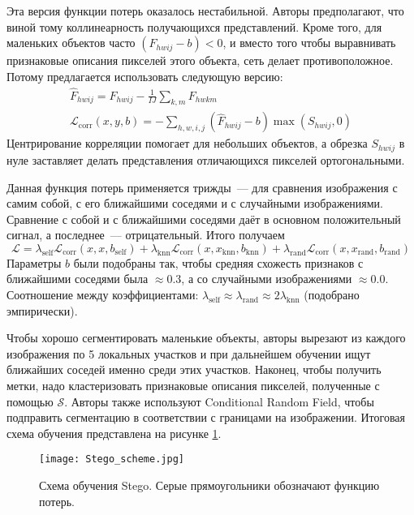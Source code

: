     Эта версия функции потерь оказалось нестабильной.
    Авторы предполагают, что виной тому коллинеарность получающихся представлений.
    Кроме того, для маленьких объектов часто $(F_{hwij} - b) < 0$, и вместо того чтобы выравнивать признаковые описания пикселей этого объекта, сеть делает противоположное.
    Потому предлагается использовать следующую версию:
    \begin{gather}
        \hat{F}_{hwij} = F_{hwij} - \frac{1}{IJ} \sum_{k, m} F_{hwkm} \\
        \mathcal{L}_\text{corr}(x, y, b) = -\sum_{h, w, i, j} (\hat{F}_{hwij} - b) \max(S_{hwij}, 0)
    \end{gather}
    Центрирование корреляции помогает для небольших объектов, а обрезка $S_{hwij}$ в нуле заставляет делать представления отличающихся пикселей ортогональными.

    Данная функция потерь применяется трижды~--- для сравнения изображения с самим собой, с его ближайшими соседями и с случайными изображениями.
    Сравнение с собой и с ближайшими соседями даёт в основном положительный сигнал, а последнее~--- отрицательный.
    Итого получаем 
    \begin{equation}
        \mathcal{L} = \lambda_\text{self} \mathcal{L}_\text{corr}(x, x, b_\text{self}) + 
        \lambda_\text{knn} \mathcal{L}_\text{corr}(x, x_\text{knn}, b_\text{knn}) +
        \lambda_\text{rand} \mathcal{L}_\text{corr}(x, x_\text{rand}, b_\text{rand}) 
    \end{equation}
    Параметры $b$ были подобраны так, чтобы средняя схожесть признаков с ближайшими соседями была $\approx 0.3$, а со случайными изображениями $\approx 0.0$.
    Соотношение между коэффициентами: $\lambda_\text{self} \approx \lambda_\text{rand} \approx 2 \lambda_\text{knn}$ (подобрано эмпирически).

    Чтобы хорошо сегментировать маленькие объекты, авторы вырезают из каждого изображения по 5 локальных участков и при дальнейшем обучении ищут ближайших соседей именно среди этих участков.
    Наконец, чтобы получить метки, надо кластеризовать признаковые описания пикселей, полученные с помощью $\mathcal{S}$.
    Авторы также используют Conditional Random Field, чтобы подправить сегментацию в соответствии с границами на изображении.
    Итоговая схема обучения представлена на рисунке \ref{fig:stego_scheme}.

    \begin{figure}
        \centering
        \texttt{[image: Stego\_scheme.jpg]}
        \caption{Схема обучения Stego. Серые прямоугольники обозначают функцию потерь.\label{fig:stego_scheme}}
    \end{figure}

